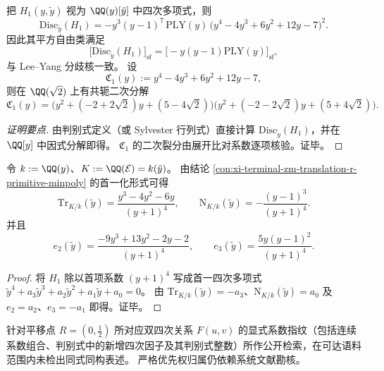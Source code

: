 \begin{conclusion}\label{con:xi-terminal-zm-translation-r-discriminant-factorization}
把 \(H_{1}(y,\tilde y)\) 视为 \(\QQ(y)[\tilde y]\) 中四次多项式，则
\[
\boxed{
\mathrm{Disc}_{\tilde y}(H_{1})
=-y^{3}(y-1)^{7}\,\mathrm{PLY}(y)\,
\bigl(y^{4}-4y^{3}+6y^{2}+12y-7\bigr)^{2}.
}
\]
因此其平方自由类满足
\[
\bigl[\mathrm{Disc}_{\tilde y}(H_{1})\bigr]_{\mathrm{sf}}
=\bigl[-y(y-1)\mathrm{PLY}(y)\bigr]_{\mathrm{sf}},
\]
与 Lee--Yang 分歧核一致。
设
\[
\mathfrak C_{1}(y):=y^{4}-4y^{3}+6y^{2}+12y-7,
\]
则在 \(\QQ(\sqrt2)\) 上有共轭二次分解
\[
\boxed{
\mathfrak C_{1}(y)=
\bigl(y^{2}+(-2+2\sqrt2)y+(5-4\sqrt2)\bigr)
\bigl(y^{2}+(-2-2\sqrt2)y+(5+4\sqrt2)\bigr).
}
\]
\end{conclusion}
\begin{proof}[证明要点]
由判别式定义（或 Sylvester 行列式）直接计算 \(\mathrm{Disc}_{\tilde y}(H_{1})\)，并在 \(\QQ[y]\) 中因式分解即得。
\(\mathfrak C_{1}\) 的二次裂分由展开比对系数逐项核验。证毕。
\end{proof}

\begin{corollary}\label{cor:xi-terminal-zm-translation-r-trace-norm}
令 \(k:=\QQ(y)\)、\(K:=\QQ(\mathcal E)=k(\tilde y)\)。
由结论 \ref{con:xi-terminal-zm-translation-r-primitive-minpoly} 的首一化形式可得
\[
\mathrm{Tr}_{K/k}(\tilde y)=\frac{y^{3}-4y^{2}-6y}{(y+1)^{4}},
\qquad
\mathrm{N}_{K/k}(\tilde y)=-\frac{(y-1)^{3}}{(y+1)^{4}}.
\]
并且
\[
e_{2}(\tilde y)=\frac{-9y^{3}+13y^{2}-2y-2}{(y+1)^{4}},
\qquad
e_{3}(\tilde y)=\frac{5y(y-1)^{2}}{(y+1)^{4}}.
\]
\end{corollary}
\begin{proof}
将 \(H_{1}\) 除以首项系数 \((y+1)^{4}\) 写成首一四次多项式
\(
\tilde y^{4}+a_{3}\tilde y^{3}+a_{2}\tilde y^{2}+a_{1}\tilde y+a_{0}=0
\)。
由 \(\mathrm{Tr}_{K/k}(\tilde y)=-a_{3}\)、\(\mathrm{N}_{K/k}(\tilde y)=a_{0}\) 及
\(e_{2}=a_{2}\)、\(e_{3}=-a_{1}\) 即得。证毕。
\end{proof}

\begin{remark}[公开检索核验的范围性说明]\label{rem:xi-terminal-zm-translation-r-public-retrieval-note}
针对平移点 \(R=(0,\tfrac12)\) 所对应双四次关系 \(F(u,v)\) 的显式系数指纹（包括连续系数组合、判别式中的新增四次因子及其判别式整数）所作公开检索，在可达语料范围内未检出同式同构表述。
严格优先权归属仍依赖系统文献勘核。
\end{remark}

